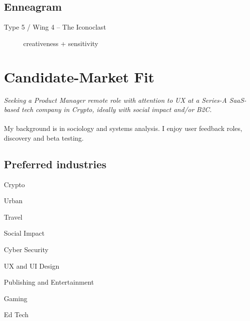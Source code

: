 \documentclass[10pt, a4paper, twocolumn]{article}
\begin{document}
 \subsection*{Enneagram}
 \begin{description}

 \item[Type 5 / Wing 4 -- The Iconoclast] %
 \item[] creativeness + sensitivity
 \end{description}


\section*{Candidate-Market Fit}
\textit{%
Seeking a Product Manager remote role
with attention to UX
at a Series-A SaaS-based tech company in Crypto,
ideally with social impact and/or B2C.
}
\\ \\
My background is in sociology and systems analysis. I enjoy user feedback roles, discovery and beta testing.
\subsection*{Preferred industries}
\begin{description}
 \item Crypto
\item Urban
\item Travel
\item Social Impact
\item Cyber Security
\item UX and UI Design
\item Publishing and Entertainment
\item Gaming
\item Ed Tech
\end{description}
\end{document}
